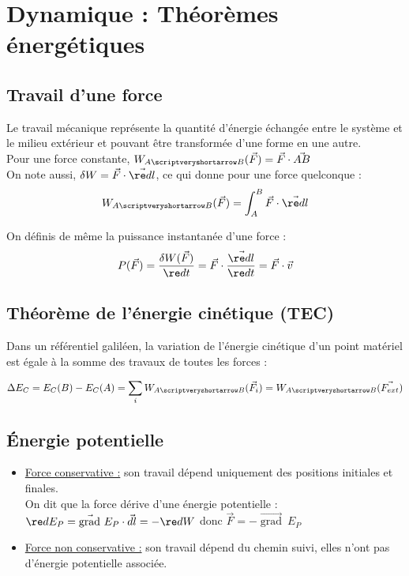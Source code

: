 \documentclass[13pt, twoside, a4paper, french]{report}
\begin{document}
\chapter{Dynamique : Théorèmes énergétiques}\label{ch:dynamique-theoremes-energetiques}


    \section{Travail d’une force}\label{sec:travail-dune-force}

        Le travail mécanique représente la quantité d’énergie échangée entre le système et le milieu extérieur et pouvant être transformée d’une forme en une autre.\\

        Pour une force constante, $W_{A\scriptveryshortarrow B}(\vec F) = \vec F \cdot \vec{AB}$\\

        On note aussi, $\delta W = \vec F \cdot \vec{\re d l}$, ce qui donne pour une force quelconque :\\
        \[ W_{A\scriptveryshortarrow B}(\vec F) = \int_A^B \vec F \cdot \vec{\re dl} \]

        On définis de même la puissance instantanée d'une force :\\
        \[ P(\vec F) = \dfrac{\delta W(\vec F)}{\re d t} = \vec F \cdot \dfrac{\vec{\re d l}}{\re dt} = \vec F \cdot \vec v \]


    \section{Théorème de l'énergie cinétique (TEC)}\label{sec:theoreme-de-l'energie-cinetique-(tec)}

        Dans un référentiel galiléen, la variation de l'énergie cinétique d'un point matériel est égale à la somme des travaux de toutes les forces :

        \[\Delta E_C = E_C(B) - E_C(A) = \sum_i W_{A \scriptveryshortarrow B}(\vec{F_i}) = W_{A \scriptveryshortarrow B}(\vec{F_{ext}})\]


    \section{Énergie potentielle}\label{sec:energie-potentielle}


        \begin{itemize}
            \item \underline{Force conservative :} son travail dépend uniquement des positions initiales et finales.\\
            On dit que la force dérive d'une énergie potentielle : $\re d E_P = \vec{\operatorname{grad}}\ E_P \cdot \vec{d l} = -\re d W$ donc $\vec F = - \vec{\operatorname{grad}}\ E_P$\\
            \item \underline{Force non conservative :} son travail dépend du chemin suivi, elles n'ont pas d'énergie potentielle associée.
        \end{itemize}
\end{document}
